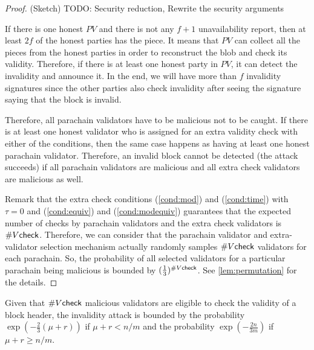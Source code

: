 \begin{proof}(Sketch)
TODO: Security reduction, Rewrite the security arguments


If there is one honest $PV$ and there is not any $f+1$ unavailability report, then at least $2f$ of the honest parties has the piece. It means that $PV$ can collect all the pieces from the honest parties in order to reconstruct the blob and check its validity. Therefore, if there is at least one honest party in $PV$, it can detect the invalidity and announce it. In the end, we will have more than $f$ invalidity signatures since the other parties also check invalidity after seeing the signature saying that the block is invalid.

Therefore, all parachain validators have to be malicious not to be caught. 
If there is at least one honest validator who is assigned for an extra validity check with either of the conditions, then the same case happens as having at least one honest parachain validator. Therefore, an invalid block cannot be detected (the attack succeeds) if all parachain validators are malicious and all extra check validators are malicious as well. 

Remark that the extra check conditions (\ref{cond:mod}) and (\ref{cond:time})  with $\tau = 0$ and (\ref{cond:equiv}) and (\ref{cond:modequiv}) guarantees that the expected number of checks by parachain validators and the extra check validators is $\#V\mathsf{check}$. %
Therefore, we can consider that the parachain validator and extra-validator selection mechanism actually randomly samples $\#V\mathsf{check}$ validators for each parachain. So, the probability of all selected validators for a particular parachain being malicious is bounded by $(\frac{1}{3})^{\#V\mathsf{check}}$. See \ref{lem:permutation} for the details.

\end{proof}



\begin{theorem}\label{thm:vcheckmal}
Given that $\#V\mathsf{check}$ malicious validators are eligible to check the validity of a block header, the invalidity attack is bounded by the probability  $\exp(-\frac{2}{3}(\mu+r))$ if $\mu + r < n/m$ and the probability $\exp(-\frac{2n}{3m})$ if $\mu + r \geq n/m$.
\end{theorem}

